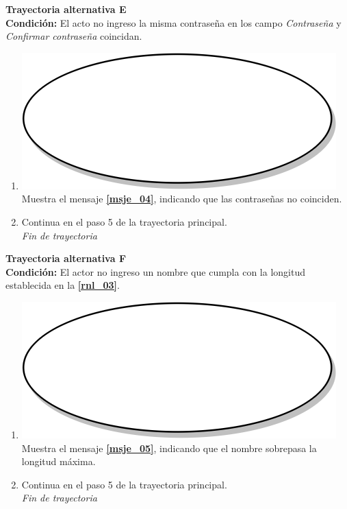 \textbf{Trayectoria alternativa E} \label{cu2_ta_e}\\
\textbf{Condición:} El acto no ingreso la misma contraseña en los campo \textit{Contraseña} y \textit{Confirmar contraseña} coincidan.\\
 \begin{enumerate}[label=E\arabic*]
    \item {\includegraphics[scale=.05]{Capitulo3/img/proceso.png} Muestra el mensaje \textbf{\ref{msje_04}}, indicando que las contraseñas no coinciden.}
    \item {Continua en el paso 5 de la trayectoria principal.} \\
    \textit{Fin de trayectoria} \\
\end{enumerate}

\textbf{Trayectoria alternativa F} \label{cu2_ta_f}\\
\textbf{Condición:} El actor no ingreso un nombre que cumpla con la longitud establecida en la \textbf{\ref{rnl_03}}.\\
 \begin{enumerate}[label=F\arabic*]
    \item {\includegraphics[scale=.05]{Capitulo3/img/proceso.png} Muestra el mensaje \textbf{\ref{msje_05}}, indicando que el nombre sobrepasa la longitud máxima.}
    \item {Continua en el paso 5 de la trayectoria principal.} \\
    \textit{Fin de trayectoria} \\
\end{enumerate}

